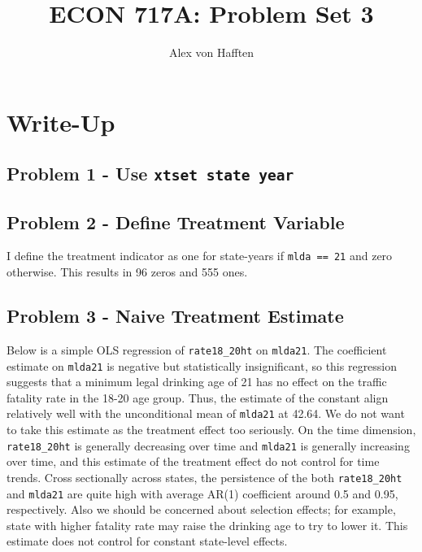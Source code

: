 \documentclass{article}
\title{ECON 717A: Problem Set 3}
\author{Alex von Hafften}
\begin{document}
\maketitle

\section{Write-Up}

\subsection*{Problem 1 - Use \texttt{xtset state year}}

\subsection*{Problem 2 - Define Treatment Variable}

I define the treatment indicator as one for state-years if \texttt{mlda == 21} and zero otherwise.  This results in 96 zeros and 555 ones.

\subsection*{Problem 3 - Naive Treatment Estimate}

Below is a simple OLS regression of \texttt{rate18\_20ht} on \texttt{mlda21}.  The coefficient estimate on \texttt{mlda21} is negative but statistically insignificant, so this regression suggests that a minimum legal drinking age of 21 has no effect on the traffic fatality rate in the 18-20 age group. Thus, the estimate of the constant align relatively well with the unconditional mean of \texttt{mlda21} at 42.64.  We do not want to take this estimate as the treatment effect too seriously.  On the time dimension, \texttt{rate18\_20ht} is generally decreasing over time and \texttt{mlda21} is generally increasing over time, and this estimate of the treatment effect do not control for time trends.  Cross sectionally across states, the persistence of the both \texttt{rate18\_20ht} and \texttt{mlda21} are quite high with average AR(1) coefficient around 0.5 and 0.95, respectively. Also we should be concerned about selection effects; for example, state with higher fatality rate may raise the drinking age to try to lower it.  This estimate does not control for constant state-level effects.

\bigskip

\begin{center}

\end{center}
\end{document}
